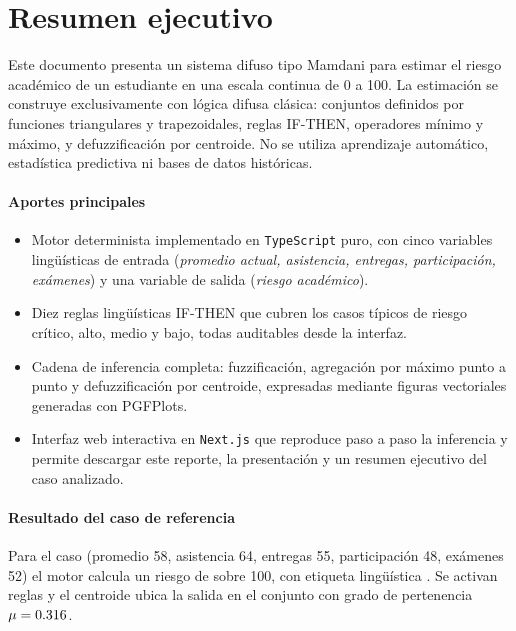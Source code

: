 \section*{Resumen ejecutivo}

Este documento presenta un sistema difuso tipo Mamdani para estimar el riesgo académico de un estudiante en una escala continua de 0 a 100. La estimación se construye exclusivamente con lógica difusa clásica: conjuntos definidos por funciones triangulares y trapezoidales, reglas IF-THEN, operadores mínimo y máximo, y defuzzificación por centroide. No se utiliza aprendizaje automático, estadística predictiva ni bases de datos históricas.

\paragraph{Aportes principales}
\begin{itemize}
  \item Motor determinista implementado en \texttt{TypeScript} puro, con cinco variables lingüísticas de entrada (\emph{promedio actual, asistencia, entregas, participación, exámenes}) y una variable de salida (\emph{riesgo académico}).
  \item Diez reglas lingüísticas IF-THEN que cubren los casos típicos de riesgo crítico, alto, medio y bajo, todas auditables desde la interfaz.
  \item Cadena de inferencia completa: fuzzificación, agregación por máximo punto a punto y defuzzificación por centroide, expresadas mediante figuras vectoriales generadas con PGFPlots.
  \item Interfaz web interactiva en \texttt{Next.js} que reproduce paso a paso la inferencia y permite descargar este reporte, la presentación y un resumen ejecutivo del caso analizado.
\end{itemize}

\paragraph{Resultado del caso de referencia}
Para el caso \emph{\CaseLabelestudiantetipicoriesgoalto} (promedio 58, asistencia 64, entregas 55, participación 48, exámenes 52) el motor calcula un riesgo de \textbf{\CaseCentroidestudiantetipicoriesgoalto} sobre 100, con etiqueta lingüística \textbf{\CaseLabelIdestudiantetipicoriesgoalto}. Se activan \CaseActiveRulesCountestudiantetipicoriesgoalto{} reglas y el centroide ubica la salida en el conjunto \emph{\CaseDominantTermestudiantetipicoriesgoalto} con grado de pertenencia $\mu=0.316$.

